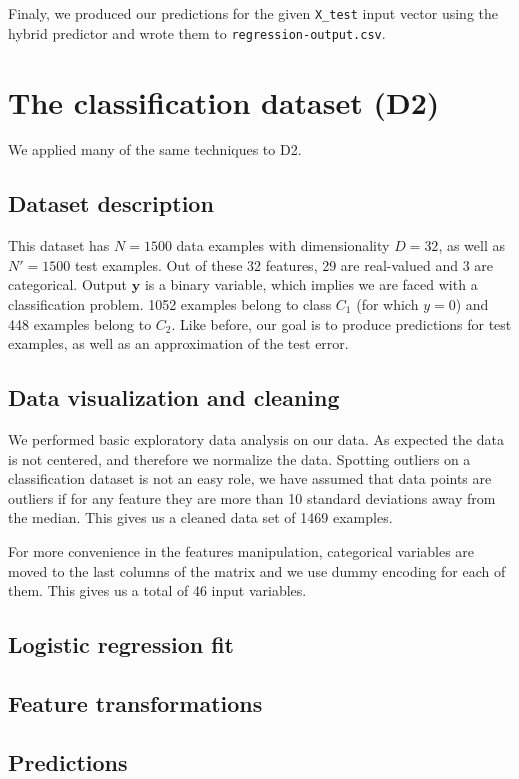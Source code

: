 \documentclass{article} %
\begin{document}
  Finaly, we produced our predictions for the given \texttt{X\_test} input vector using the hybrid predictor and wrote them to \texttt{regression-output.csv}.

\section{The classification dataset (D2)}
  We applied many of the same techniques to D2.

  \subsection{Dataset description}
  This dataset has $N = 1500$ data examples with dimensionality $D = 32$, as well as $N' = 1500$ test examples. Out of these 32 features, 29 are real-valued and 3 are categorical. Output $\mathbf{y}$ is a binary variable, which implies we are faced with a classification problem. 1052 examples belong to class $C_1$ (for which $y = 0$) and 448 examples belong to $C_2$. Like before, our goal is to produce predictions for test examples, as well as an approximation of the test error.

  \subsection{Data visualization and cleaning}
We performed basic exploratory data analysis on our data. As expected the data is not centered, and therefore we normalize the data. Spotting outliers on a classification dataset is not an easy role, we have assumed that data points are outliers if for any feature they are more than 10 standard deviations away from the median. This gives us a cleaned data set of 1469 examples.

For more convenience in the features manipulation, categorical variables are moved to the last columns of the matrix and we use dummy encoding for each of them. This gives us a total of 46 input variables.

  \subsection{Logistic regression fit}

  \subsection{Feature transformations}

  \subsection{Predictions}
\end{document}
